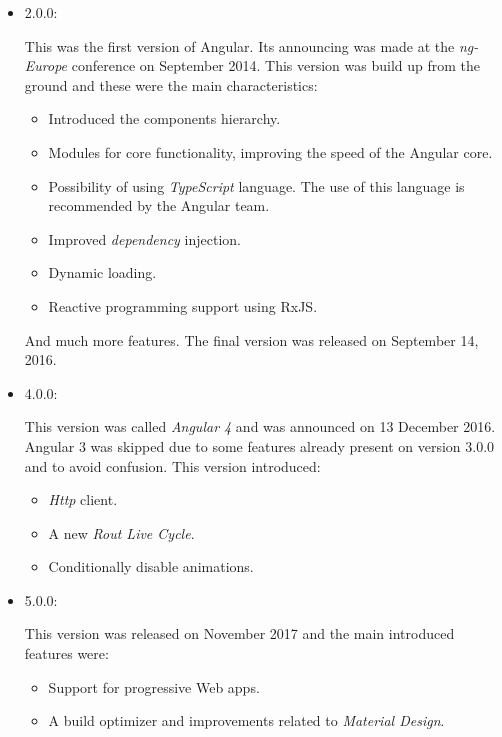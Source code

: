 \documentclass[a4paper, 12pt, english]{book}
\begin{document}
\begin{itemize}
    \item 2.0.0:

        This was the first version of Angular. Its announcing was made at the \textit{ng-Europe} conference on September 2014. This version was build up from the ground and these were the main characteristics:
        \begin{itemize}
            \item Introduced the components hierarchy.
            \item Modules for core functionality, improving the speed of the Angular core.
            \item Possibility of using \textit{TypeScript} language. The use of this language is recommended by the Angular team.
            \item Improved \textit{dependency} injection.
            \item Dynamic loading.
            \item Reactive programming support using RxJS.
        \end{itemize}
        And much more features. The final version was released on September 14, 2016.
    \item 4.0.0:

        This version was called \textit{Angular 4} and was announced on 13 December 2016. Angular 3 was skipped due to some features already present on version 3.0.0 and to avoid confusion. This version introduced:
        \begin{itemize}
            \item \textit{Http} client.
            \item A new \textit{Rout Live Cycle}.
            \item Conditionally disable animations.
        \end{itemize}
    \item 5.0.0:

        This version was released on November 2017 and the main introduced features were:
        \begin{itemize}
            \item Support for progressive Web apps.
            \item A build optimizer and improvements related to \textit{Material Design}.
        \end{itemize}
\end{itemize}
\end{document}
